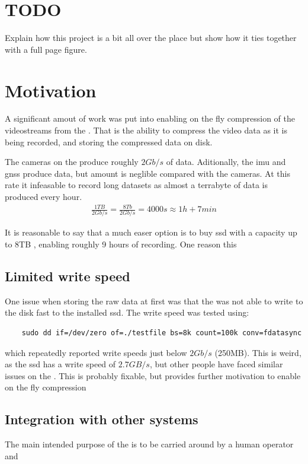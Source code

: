 \section{TODO}
Explain how this project is a bit all over the place but show how it ties together with a full page figure.


\section{Motivation}
A significant amout of work was put into enabling on the fly compression of the videostreams from the \sr.
That is the ability to compress the video data as it is being recorded, and storing the compressed data on disk.

The cameras on the \sr produce roughly $2Gb/s$ of data.
Aditionally, the \gls{imu} and \gls{gnss} produce data, but amount is neglible compared with the cameras.
At this rate it infeasable to record long datasets as almost a terrabyte of data is produced every hour.
\begin{align}
    \frac{1TB}{2Gb/s}  = \frac{8Tb}{2Gb/s} = 4000s \approx 1h + 7min
\end{align}

It is reasonable to say that a much easer option is to buy \gls{ssd} with a capacity up to 8TB \cite{CorsairMP600PRO}, enabling roughly 9 hours of recording.
One reason this
\cite{microntechnologyMicron2300SSD2020}


\subsection{Limited write speed}
One issue when storing the raw data at first was that the \jx was not able to write to the disk fast to the installed \gls{ssd}.
The write speed was tested using:
\begin{verbatim}
    sudo dd if=/dev/zero of=./testfile bs=8k count=100k conv=fdatasync
\end{verbatim}
which repeatedly reported write speeds just below $2Gb/s$ (250MB).
This is weird, as the \gls{ssd} has a write speed of $2.7GB/s$, but other people have faced similar issues on the \jx \cite{microntechnologyMicron2300SSD2020} \cite{dtyuImbalancedPerformanceRead2018}.
This is probably fixable, but provides further motivation to enable on the fly compression


\subsection{Integration with other systems}
The main intended purpose of the \sr is to be carried around by a human operator and

